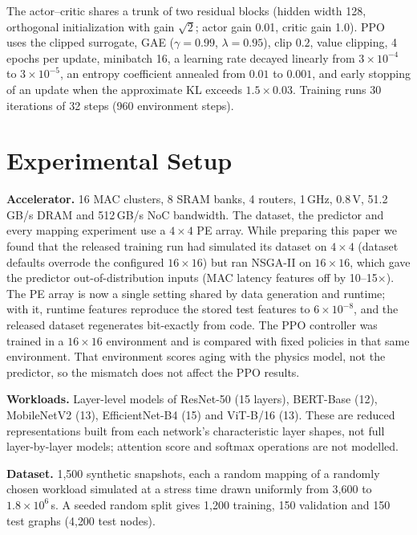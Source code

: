 \documentclass[conference]{IEEEtran}
\begin{document}
The actor--critic shares a trunk of two residual blocks (hidden width 128, orthogonal initialization with gain $\sqrt{2}$; actor gain 0.01, critic gain 1.0). PPO~\cite{schulman2017ppo} uses the clipped surrogate, GAE ($\gamma = 0.99$, $\lambda = 0.95$), clip $0.2$, value clipping, 4 epochs per update, minibatch 16, a learning rate decayed linearly from $3\times 10^{-4}$ to $3\times 10^{-5}$, an entropy coefficient annealed from $0.01$ to $0.001$, and early stopping of an update when the approximate KL exceeds $1.5 \times 0.03$. Training runs 30 iterations of 32 steps (960 environment steps).

\section{Experimental Setup}
\label{sec:experiments}

\textbf{Accelerator.} 16 MAC clusters, 8 SRAM banks, 4 routers, 1\,GHz, 0.8\,V, 51.2\,GB/s DRAM and 512\,GB/s NoC bandwidth. The dataset, the predictor and every mapping experiment use a $4\times 4$ PE array. While preparing this paper we found that the released training run had simulated its dataset on $4\times 4$ (dataset defaults overrode the configured $16\times 16$) but ran NSGA-II on $16\times 16$, which gave the predictor out-of-distribution inputs (MAC latency features off by 10--15$\times$). The PE array is now a single setting shared by data generation and runtime; with it, runtime features reproduce the stored test features to $6\times 10^{-8}$, and the released dataset regenerates bit-exactly from code. The PPO controller was trained in a $16\times 16$ environment and is compared with fixed policies in that same environment. That environment scores aging with the physics model, not the predictor, so the mismatch does not affect the PPO results.

\textbf{Workloads.} Layer-level models of ResNet-50 (15 layers), BERT-Base (12), MobileNetV2 (13), EfficientNet-B4 (15) and ViT-B/16 (13). These are reduced representations built from each network's characteristic layer shapes, not full layer-by-layer models; attention score and softmax operations are not modelled.

\textbf{Dataset.} 1{,}500 synthetic snapshots, each a random mapping of a randomly chosen workload simulated at a stress time drawn uniformly from 3{,}600 to $1.8\times 10^{6}$\,s. A seeded random split gives 1{,}200 training, 150 validation and 150 test graphs (4{,}200 test nodes).
\end{document}
